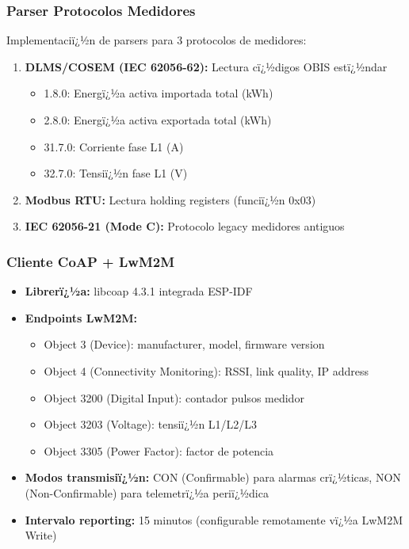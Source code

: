 \subsubsection{Parser Protocolos Medidores}

Implementaciï¿½n de parsers para 3 protocolos de medidores:

\begin{enumerate}
\item \textbf{DLMS/COSEM (IEC 62056-62):} Lectura cï¿½digos OBIS estï¿½ndar
    \begin{itemize}
    \item 1.8.0: Energï¿½a activa importada total (kWh)
    \item 2.8.0: Energï¿½a activa exportada total (kWh)
    \item 31.7.0: Corriente fase L1 (A)
    \item 32.7.0: Tensiï¿½n fase L1 (V)
    \end{itemize}
\item \textbf{Modbus RTU:} Lectura holding registers (funciï¿½n 0x03)
\item \textbf{IEC 62056-21 (Mode C):} Protocolo legacy medidores antiguos
\end{enumerate}

\subsubsection{Cliente CoAP + LwM2M}

\begin{itemize}
\item \textbf{Librerï¿½a:} libcoap 4.3.1 integrada ESP-IDF
\item \textbf{Endpoints LwM2M:} 
    \begin{itemize}
    \item Object 3 (Device): manufacturer, model, firmware version
    \item Object 4 (Connectivity Monitoring): RSSI, link quality, IP address
    \item Object 3200 (Digital Input): contador pulsos medidor
    \item Object 3203 (Voltage): tensiï¿½n L1/L2/L3
    \item Object 3305 (Power Factor): factor de potencia
    \end{itemize}
\item \textbf{Modos transmisiï¿½n:} CON (Confirmable) para alarmas crï¿½ticas, NON (Non-Confirmable) para telemetrï¿½a periï¿½dica
\item \textbf{Intervalo reporting:} 15 minutos (configurable remotamente vï¿½a LwM2M Write)
\end{itemize}

